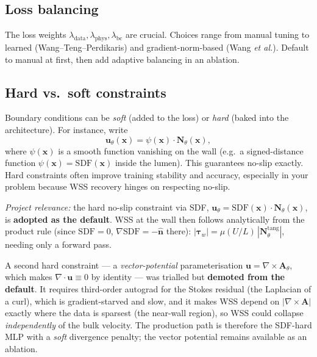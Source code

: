 \documentclass[11pt]{article}
\begin{document}
\subsection*{Loss balancing}
The loss weights $\lambda_{\text{data}}, \lambda_{\text{phys}}, \lambda_{\text{bc}}$ are crucial. Choices range from manual tuning to learned (Wang--Teng--Perdikaris) and gradient-norm-based (Wang \emph{et al.}). Default to manual at first, then add adaptive balancing in an ablation.

\subsection*{Hard vs.\ soft constraints}
Boundary conditions can be \emph{soft} (added to the loss) or \emph{hard} (baked into the architecture). For instance, write
\[
\mathbf{u}_\theta(\mathbf{x}) = \psi(\mathbf{x}) \cdot \mathbf{N}_\theta(\mathbf{x}),
\]
where $\psi(\mathbf{x})$ is a smooth function vanishing on the wall (e.g.\ a signed-distance function $\psi(\mathbf{x}) = \mathrm{SDF}(\mathbf{x})$ inside the lumen). This guarantees no-slip exactly. Hard constraints often improve training stability and accuracy, especially in your problem because WSS recovery hinges on respecting no-slip.

\textit{Project relevance:} the hard no-slip constraint via SDF, $\mathbf{u}_\theta = \mathrm{SDF}(\mathbf{x})\cdot\mathbf{N}_\theta(\mathbf{x})$, is \textbf{adopted as the default}. WSS at the wall then follows analytically from the product rule (since $\mathrm{SDF}=0$, $\nabla\mathrm{SDF}=-\hat{\mathbf{n}}$ there): $|\boldsymbol\tau_w| = \mu(U/L)\,|\mathbf{N}_\theta^{\text{tang}}|$, needing only a forward pass.

A second hard constraint --- a \emph{vector-potential} parameterisation $\mathbf{u}=\nabla\times\mathbf{A}_\theta$, which makes $\nabla\cdot\mathbf{u}\equiv0$ by identity --- was trialled but \textbf{demoted from the default}. It requires third-order autograd for the Stokes residual (the Laplacian of a curl), which is gradient-starved and slow, and it makes WSS depend on $|\nabla\times\mathbf{A}|$ exactly where the data is sparsest (the near-wall region), so WSS could collapse \emph{independently} of the bulk velocity. The production path is therefore the SDF-hard MLP with a \emph{soft} divergence penalty; the vector potential remains available as an ablation.
\end{document}
